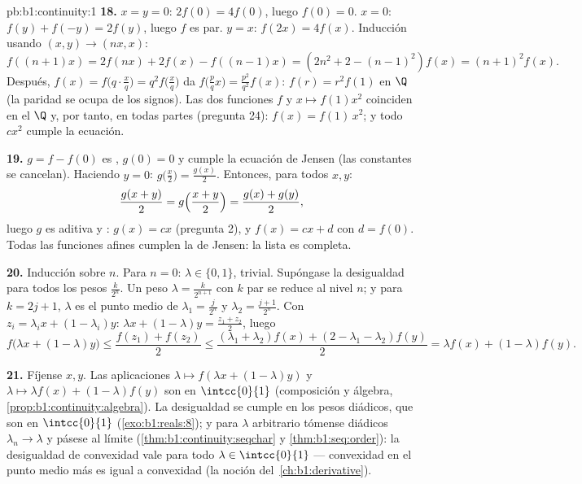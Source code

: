 \begin{solution}{pb:b1:continuity:1}
\textbf{18.} $x = y = 0$: $2f(0) = 4f(0)$, luego $f(0) = 0$. $x = 0$:
$f(y) + f(-y) = 2f(y)$, luego $f$ es par. $y = x$: $f(2x) = 4f(x)$.
Inducción usando $(x, y) \to (nx, x)$:
\[
f((n{+}1)x) = 2f(nx) + 2f(x) - f((n{-}1)x)
= (2n^2 + 2 - (n-1)^2) f(x) = (n+1)^2 f(x) .
\]
Después, $f(x) = f\bigl(q\cdot\frac xq\bigr) = q^2 f\bigl(\frac
xq\bigr)$ da $f\bigl(\frac pq x\bigr) = \frac{p^2}{q^2}f(x)$:
$f(r) = r^2 f(1)$ en $\Q$ (la paridad se ocupa de los signos). Las dos
funciones  $f$ y $x \mapsto f(1)x^2$ coinciden en el
  $\Q$ y, por tanto, en todas partes (pregunta 24):
$f(x) = f(1)\,x^2$; y todo $cx^2$ cumple la ecuación.

\textbf{19.} $g = f - f(0)$ es , $g(0) = 0$ y cumple la
ecuación de Jensen (las constantes se cancelan). Haciendo $y = 0$:
$g\bigl(\frac x2\bigr) = \frac{g(x)}{2}$. Entonces, para todos
$x, y$:
\[
\frac{g(x + y)}{2} = g\Bigl(\frac{x+y}{2}\Bigr)
= \frac{g(x) + g(y)}{2} ,
\]
luego $g$ es aditiva y : $g(x) = cx$ (pregunta 2), y
$f(x) = cx + d$ con $d = f(0)$. Todas las funciones afines cumplen la
de Jensen: la lista es completa.

\textbf{20.} Inducción sobre $n$. Para $n = 0$: $\lambda \in \{0, 1\}$,
trivial. Supóngase la desigualdad para todos los pesos
$\frac{k}{2^n}$. Un peso $\lambda = \frac{k}{2^{n+1}}$ con $k$ par se
reduce al nivel $n$; y para $k = 2j + 1$, $\lambda$ es el punto medio
de $\lambda_1 = \frac{j}{2^n}$ y $\lambda_2 = \frac{j+1}{2^n}$. Con
$z_i = \lambda_i x + (1 - \lambda_i)y$:
$\lambda x + (1-\lambda)y = \frac{z_1 + z_2}{2}$, luego
\[
f\bigl(\lambda x + (1{-}\lambda)y\bigr)
\leq \frac{f(z_1) + f(z_2)}{2}
\leq \frac{(\lambda_1 + \lambda_2)f(x) + (2 - \lambda_1 -
\lambda_2)f(y)}{2}
= \lambda f(x) + (1 - \lambda)f(y) .
\]

\textbf{21.} Fíjense $x, y$. Las aplicaciones
$\lambda \mapsto f(\lambda x + (1 - \lambda)y)$ y
$\lambda \mapsto \lambda f(x) + (1 - \lambda)f(y)$ son  en
$\intcc{0}{1}$ (composición y álgebra,
\cref{prop:b1:continuity:algebra}). La desigualdad se cumple en los
pesos diádicos, que son  en $\intcc{0}{1}$
(\cref{exo:b1:reals:8}); y para $\lambda$ arbitrario tómense diádicos
$\lambda_n \to \lambda$ y pásese al límite
(\cref{thm:b1:continuity:seqchar} y \cref{thm:b1:seq:order}): la
desigualdad de convexidad vale para todo
$\lambda \in \intcc{0}{1}$ --- convexidad en el punto medio más
 es igual a convexidad (la noción
del~\cref{ch:b1:derivative}).


\end{solution}
